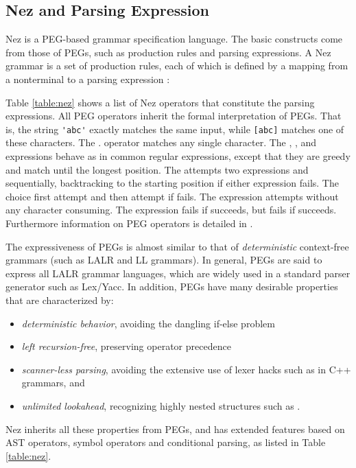\documentclass[preprint]{sigplanconf}
\begin{document}
\subsection{Nez and Parsing Expression}

Nez is a PEG-based grammar specification language. The basic constructs come from those of PEGs, such as production rules and parsing expressions. A Nez grammar is a set of production rules, each of which is defined by a mapping from a nonterminal  to a parsing expression :



Table \ref{table:nez} shows a list of Nez operators that constitute the parsing expressions. All PEG operators inherit the formal interpretation of PEGs\cite{POPL04_PEG}. That is, the string \verb|'abc'| exactly matches the same input, while \verb|[abc]| matches one of these characters. The . operator matches any single character. The , , and  expressions behave as in common regular expressions, except that they are greedy and match until the longest position. The  attempts two expressions  and  sequentially, backtracking to the starting position if either expression fails.  The choice  first attempt  and then attempt  if  fails. The expression  attempts  without any character consuming. The expression  fails if  succeeds, but fails if  succeeds. Furthermore information on PEG operators is detailed in \cite{POPL04_PEG}.

The expressiveness of PEGs is almost similar to that of {\em deterministic} context-free grammars (such as LALR and LL grammars). In general, PEGs are said to express all LALR grammar languages, which are widely used in a standard parser generator such as Lex/Yacc\cite{Yacc}. In addition, PEGs have many desirable properties that are characterized by:

\begin{itemize}
\item {\em deterministic behavior}, avoiding the dangling if-else problem
\item {\em left recursion-free}, preserving operator precedence
\item {\em scanner-less parsing}, avoiding the extensive use of lexer hacks such as in C++ grammars, and 
\item {\em unlimited lookahead}, recognizing highly nested structures such as        . 
\end{itemize}

Nez inherits all these properties from PEGs, and has extended features based on AST operators, symbol operators and conditional parsing, as listed in Table \ref{table:nez}. 
\end{document}
